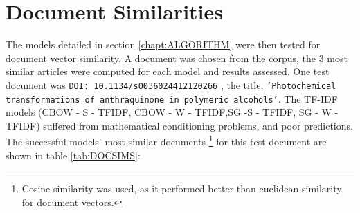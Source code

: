\section{Document Similarities}
The models detailed in section \ref{chapt:ALGORITHM} were then tested for document vector similarity. A document was chosen from the corpus, the 3 most similar articles were computed for each model and results assessed. One test document was \texttt{DOI: 10.1134/s0036024412120266} \cite{docassay}, the title,
\texttt{'Photochemical transformations of anthraquinone in polymeric alcohols'}. The TF-IDF models (CBOW - S - TFIDF, CBOW - W - TFIDF,SG -S - TFIDF, SG - W - TFIDF) suffered from mathematical conditioning problems, and poor predictions. The successful models' most similar documents \footnote{Cosine similarity was used, as it performed better than euclidean similarity for document vectors.} for this test document are shown in table \ref{tab:DOCSIMS}:

